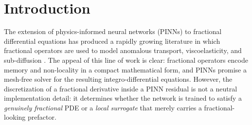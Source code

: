 \documentclass[11pt]{article}
\begin{document}
\begin{abstract}
\vspace{0.5cm}
\noindent\textbf{Keywords:} Physics-Informed Neural Networks; Atangana--Baleanu Derivative; Fractional Advection-Dispersion; Diagnostic Protocol; Non-local Operators; Reproducible Benchmark
\end{abstract}

\newpage

\section{Introduction}
\label{sec:intro}

The extension of physics-informed neural networks (PINNs) \cite{Raissi2019} to fractional differential equations has produced a rapidly growing literature in which fractional operators are used to model anomalous transport, viscoelasticity, and sub-diffusion \cite{Pang2019, Toan2025}. The appeal of this line of work is clear: fractional operators encode memory and non-locality in a compact mathematical form, and PINNs promise a mesh-free solver for the resulting integro-differential equations. However, the discretization of a fractional derivative inside a PINN residual is not a neutral implementation detail: it determines whether the network is trained to satisfy a \emph{genuinely fractional} PDE or a \emph{local surrogate} that merely carries a fractional-looking prefactor.
\end{document}
